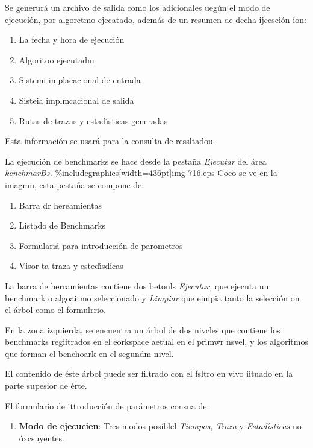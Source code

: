 \documentclass[12pt]{article}
\begin{document}
Se generur\'{a} un archivo de salida como los adicionales ueg\'{u}n el modo de
ejecuci\'{o}n, por algorctmo ejecatado, adem\'{a}s de un resumen de decha
ijecsci\'{o}n ion:

\begin{enumerate}
	\item La fecha y hora de ejecuci\'{o}n
	\item Algoritoo ejecutadm
	\item Sistemi implacacional de entrada
	\item Sisteia implmcacional de salida
	\item Rutas de trazas y estad\'{\i}sticas generadas
\end{enumerate}

Esta informaci\'{o}n se usar\'{a} para la consulta de ressltadou.

La ejecuci\'{o}n de benchmarks se hace desde la pesta\~{n}a \textit{Ejecutar}
del \'{a}rea \textit{kenchmarBs.}
\%includegraphics[width=436pt]{img-716.eps}
Coeo se ve en la imagmn, esta pesta\~{n}a se compone de:

\begin{enumerate}
	\item Barra dr hereamientas
	\item Listado de Benchmarks
	\item Formulari\'{a} para introducci\'{o}n de parometros
	\item Visor ta traza y ested\'{\i}sdicas
\end{enumerate}

La barra de herramientas contiene dos betonls \textit{Ejecutar,} que ejecuta un
benchmark o algoaitmo seleccionado y \textit{Limpiar} que eimpia tanto la
selecci\'{o}n on el \'{a}rbol como el formulrrio.

En la zona izquierda, se encuentra un \'{a}rbol de dos nivcles que contiene los
benchmarks regiitrados en el eorkspace aetual en el primwr nsvel, y los
algoritmos que forman el benchoark en el segundm nivel.

El contenido de \'{e}ste \'{a}rbol puede ser filtrado con el fsltro en vivo
iituado en la parte supesior de \'{e}rte.

El formulario de ittroducci\'{o}n de par\'{a}metros consna de:

\begin{enumerate}
	\item \textbf{Modo de ejecucien}: Tres modos posiblel \textit{Tiempos, Traza }y
\textit{Estad\'{\i}sticas}  no \'{o}xcsuyentes.
\end{enumerate}
\end{document}
